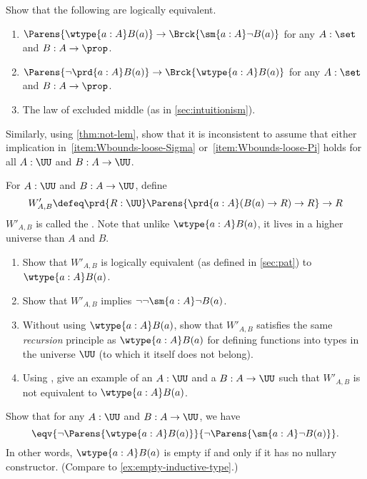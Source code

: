 \begin{ex}\label{ex:Wbounds-loose}
  Show that the following are logically equivalent.
  \begin{enumerate}
  \item $\Parens{\wtype{a:A} B(a)} \to \Brck{\sm{a:A} \neg B(a)}$ for any $A:\set$ and $B:A\to \prop$.\label{item:Wbounds-loose-Sigma}
  \item $\Parens{\neg \prd{a:A} B(a)} \to \Brck{\wtype{a:A} B(a)}$ for any $A:\set$ and $B:A\to \prop$.\label{item:Wbounds-loose-Pi}
  \item The law of excluded middle (as in \cref{sec:intuitionism}).
  \end{enumerate}
  Similarly, using \cref{thm:not-lem}, show that it is inconsistent to assume that either implication in~\ref{item:Wbounds-loose-Sigma} or~\ref{item:Wbounds-loose-Pi} holds for all $A:\UU$ and $B:A\to \UU$.
\end{ex}

\begin{ex}\label{ex:Wimpred}
  For $A:\UU$ and $B:A\to \UU$, define
  \[ W'_{A,B} \defeq \prd{R:\UU} \Parens{\prd{a:A} (B(a) \to R) \to R} \to R \]
  $W'_{A,B}$ is called the .
  Note that unlike $\wtype{a:A} B(a)$, it lives in a higher universe than $A$ and $B$.
  \begin{enumerate}
  \item Show that $W'_{A,B}$ is logically equivalent (as defined in \cref{sec:pat}) to $\wtype{a:A} B(a)$.
  \item Show that $W'_{A,B}$ implies $\neg\neg \sm{a:A} \neg B(a)$.
  \item Without using $\wtype{a:A} B(a)$, show that $W'_{A,B}$ satisfies the same \emph{recursion} principle as $\wtype{a:A} B(a)$ for defining functions into types in the universe $\UU$ (to which it itself does not belong).
  \item Using \LEM, give an example of an $A:\UU$ and a $B:A\to \UU$ such that $W'_{A,B}$ is not equivalent to $\wtype{a:A} B(a)$.
  \end{enumerate}
\end{ex}

\begin{ex}\label{ex:no-nullary-constructor}
  Show that for any $A:\UU$ and $B:A\to\UU$, we have
  \[ \eqv{\neg\Parens{\wtype{a:A} B(a)}}{\neg\Parens{\sm{a:A} \neg B(a)}}. \]
  In other words, $\wtype{a:A} B(a)$ is empty if and only if it has no nullary constructor.
  (Compare to \cref{ex:empty-inductive-type}.)
\end{ex}

